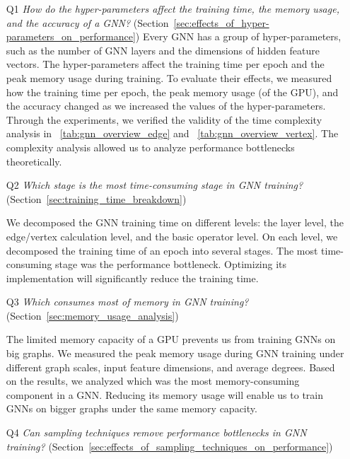 \begin{itemize}

    \item[Q1] \emph{How do the hyper-parameters affect the training time, the memory usage, and the accuracy of a GNN?} (Section~\ref{sec:effects_of_hyper-parameters_on_performance})
          Every GNN has a group of hyper-parameters, such as the number of GNN layers and the dimensions of hidden feature vectors.
          The hyper-parameters affect the training time per epoch and the peak memory usage during training.
          To evaluate their effects, we measured how the training time per epoch, the peak memory usage (of the GPU), and the accuracy changed as we increased the values of the hyper-parameters.
          Through the experiments, we verified the validity of the time complexity analysis in \tablename~\ref{tab:gnn_overview_edge} and \tablename~\ref{tab:gnn_overview_vertex}.
          The complexity analysis allowed us to analyze performance bottlenecks theoretically.

    \item[Q2] \emph{Which stage is the most time-consuming stage in GNN training?} (Section~\ref{sec:training_time_breakdown})

          We decomposed the GNN training time on different levels: the layer level, the edge/vertex calculation level, and the basic operator level.
          On each level, we decomposed the training time of an epoch into several stages.
          The most time-consuming stage was the performance bottleneck.
          Optimizing its implementation will significantly reduce the training time.

    \item[Q3] \emph{Which consumes most of memory in GNN training?} (Section~\ref{sec:memory_usage_analysis})

          The limited memory capacity of a GPU prevents us from training GNNs on big graphs.
          We measured the peak memory usage during GNN training under different graph scales, input feature dimensions, and average degrees.
          Based on the results, we analyzed which was the most memory-consuming component in a GNN.
          Reducing its memory usage will enable us to train GNNs on bigger graphs under the same memory capacity.

    \item[Q4] \emph{Can sampling techniques remove performance bottlenecks in GNN training?} (Section~\ref{sec:effects_of_sampling_techniques_on_performance})


\end{itemize}
